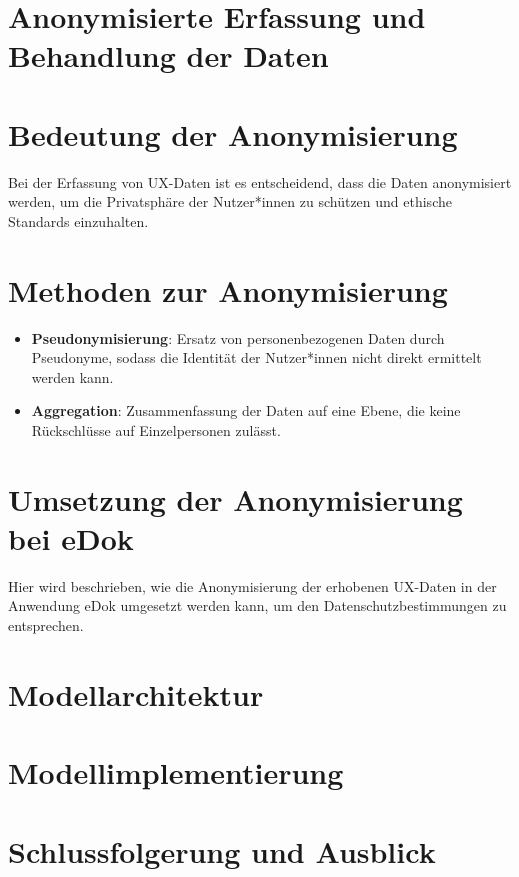 \documentclass[12pt,oneside]{article}
\begin{document}
  
 
\section{Anonymisierte Erfassung und Behandlung der Daten}
\section{Bedeutung der Anonymisierung}
Bei der Erfassung von UX-Daten ist es entscheidend, dass die Daten anonymisiert werden, um die Privatsphäre der Nutzer*innen zu schützen und ethische Standards einzuhalten.
\section{Methoden zur Anonymisierung}
\begin{itemize}
\item \textbf{Pseudonymisierung}: Ersatz von personenbezogenen Daten durch Pseudonyme, sodass die Identität der Nutzer*innen nicht direkt ermittelt werden kann.
\item \textbf{Aggregation}: Zusammenfassung der Daten auf eine Ebene, die keine Rückschlüsse auf Einzelpersonen zulässt.
\end{itemize}
\section{Umsetzung der Anonymisierung bei eDok}
Hier wird beschrieben, wie die Anonymisierung der erhobenen UX-Daten in der Anwendung eDok umgesetzt werden kann, um den Datenschutzbestimmungen zu entsprechen.
\section{Modellarchitektur}
 
\section{Modellimplementierung}
 
\section{Schlussfolgerung und Ausblick}
 
 
 
  
\printbibliography
 
\end{document}
